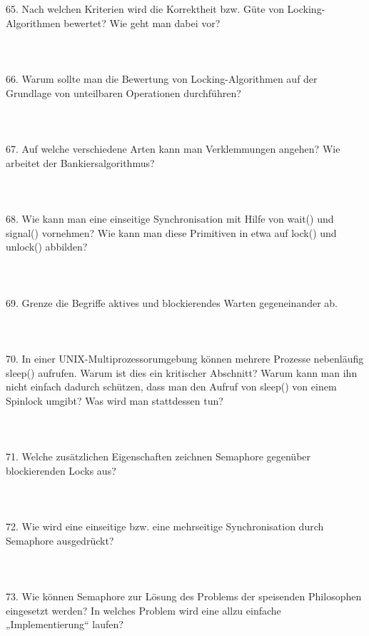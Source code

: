 \documentclass{article}
\begin{document}
\\
\\
65. Nach welchen Kriterien wird die Korrektheit bzw. Güte von Locking-Algorithmen bewertet?
Wie geht man dabei vor?
\\
\\
\\
\\
66. Warum sollte man die Bewertung von Locking-Algorithmen auf der Grundlage von unteilbaren Operationen durchführen?
\\
\\
\\
\\
67. Auf welche verschiedene Arten kann man Verklemmungen angehen? Wie arbeitet der
Bankiersalgorithmus?
\\
\\
\\
\\
68. Wie kann man eine einseitige Synchronisation mit Hilfe von wait() und signal() vornehmen? Wie kann man diese Primitiven in etwa auf lock() und unlock() abbilden?
\\
\\
\\
\\
69. Grenze die Begriffe aktives und blockierendes Warten gegeneinander ab.
\\
\\
\\
\\
70. In einer UNIX-Multiprozessorumgebung können mehrere Prozesse nebenläufig sleep()
aufrufen. Warum ist dies ein kritischer Abschnitt? Warum kann man ihn nicht einfach
dadurch schützen, dass man den Aufruf von sleep() von einem Spinlock umgibt? Was
wird man stattdessen tun?
\\
\\
\\
\\
71. Welche zusätzlichen Eigenschaften zeichnen Semaphore gegenüber blockierenden Locks
aus?
\\
\\
\\
\\
72. Wie wird eine einseitige bzw. eine mehrseitige Synchronisation durch Semaphore ausgedrückt?
\\
\\
\\
\\
73. Wie können Semaphore zur Lösung des Problems der speisenden Philosophen eingesetzt
werden? In welches Problem wird eine allzu einfache „Implementierung“ laufen?
\end{document}

